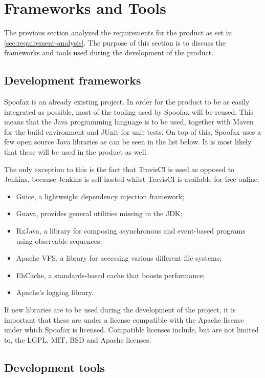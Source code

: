 \section{Frameworks and Tools}
\label{sec:realisation-product}

The previous section analyzed the requirements for the product as set in
\cref{sec:requirement-analysis}. The purpose of this section is to discuss the
frameworks and tools used during the development of the product.

\subsection{Development frameworks}
\label{ssec:frameworks}

Spoofax is an already existing project. In order for the product to be as easily
integrated as possible, most of the tooling used by Spoofax will be reused. This
means that the Java programming language is to be used, together with Maven for
the build environment and JUnit for unit tests. On top of this, Spoofax uses a
few open source Java libraries as can be seen in the list below. It is most
likely that these will be used in the product as well.

The only exception to this is the fact that TravisCI is used as opposed to
Jenkins, because Jenkins is self-hosted whilst TravisCI is available for free
online.

\begin{itemize}
  \item Guice, a lightweight dependency injection framework;
  \item Guava, provides general utilities missing in the JDK;
  \item RxJava, a library for composing asynchronous and event-based programs
    using observable sequences;
  \item Apache VFS, a library for accessing various different file systems;
  \item EhCache, a standards-based cache that boosts performance;
  \item Apache's logging library.
\end{itemize}

If new libraries are to be used during the development of the project, it is
important that these are under a license compatible with the Apache license
under which Spoofax is licensed. Compatible licenses include, but are not
limited to, the LGPL, MIT, BSD and Apache licenses.

\subsection{Development tools}
\label{ssec:tools}

